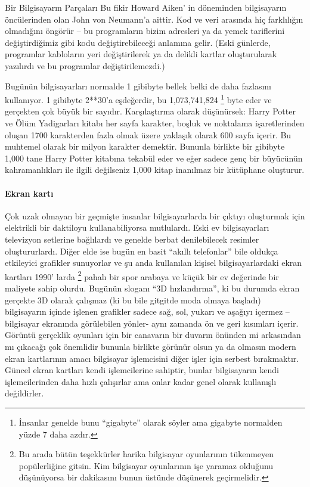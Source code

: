 \begin{section}{Bir Bilgisayarın Parçaları}
Bu fikir Howard Aiken' in döneminden bilgisayarın öncülerinden olan John von Neumann'a aittir. Kod ve veri arasında hiç farklılığın olmadığını öngörür – bu programların bizim adresleri ya da yemek tariflerini değiştirdiğimiz gibi kodu değiştirebileceği anlamına gelir. (Eski günlerde, programlar kabloların yeri değiştirilerek ya da delikli kartlar oluşturularak yazılırdı ve bu programlar değiştirilemezdi.)

Bugünün bilgisayarları normalde 1 gibibyte bellek belki de daha fazlasını kullanıyor. 1 gibibyte 2**30'a eşdeğerdir, bu 1,073,741,824 
\footnote{İnsanlar genelde bunu “gigabyte” olarak söyler ama gigabyte normalden yüzde 7 daha azdır.}
byte eder ve gerçekten çok büyük bir sayıdır. Karşılaştırma olarak düşünürsek: Harry Potter ve Ölüm Yadigarları kitabı her sayfa karakter, boşluk ve noktalama işaretlerinden oluşan 1700 karakterden fazla olmak üzere yaklaşık olarak 600 sayfa içerir. Bu muhtemel olarak bir milyon karakter demektir. Bununla birlikte bir gibibyte 1,000 tane Harry Potter kitabına tekabül eder ve eğer sadece genç bir büyücünün kahramanlıkları ile ilgili değilseniz 1,000 kitap inanılmaz bir kütüphane oluşturur.
\paragraph{Ekran kartı}{Çok uzak olmayan bir geçmişte insanlar bilgisayarlarda bir çıktıyı oluşturmak için elektrikli bir daktiloyu kullanabiliyorsa mutlulardı. Eski ev bilgisayarları televizyon setlerine bağlılardı ve genelde berbat denilebilecek resimler oluştururlardı. Diğer elde ise bugün en basit “akıllı telefonlar” bile oldukça etkileyici grafikler sunuyorlar ve şu anda kullanılan kişisel bilgisayarlardaki ekran kartları 1990' larda 
\footnote{Bu arada bütün teşekkürler harika bilgisayar oyunlarının tükenmeyen popülerliğine gitsin. Kim bilgisayar oyunlarının işe yaramaz olduğunu düşünüyorsa bir dakikasını bunun üstünde düşünerek geçirmelidir.}
pahalı bir spor arabaya ve küçük bir ev değerinde bir maliyete sahip olurdu. Bugünün sloganı “3D hızlandırma”, ki bu durumda ekran gerçekte 3D olarak çalışmaz (ki bu bile gitgitde moda olmaya başladı) bilgisayarın içinde işlenen grafikler sadece sağ, sol, yukarı ve aşağıyı içermez – bilgisayar ekranında görülebilen yönler- aynı zamanda ön ve geri kısımları içerir. Görüntü gerçeklik oyunları için bir canavarın bir duvarın önünden mi arkasından mı çıkacağı çok önemlidir bununla birlikte görünür olsun ya da olmasın modern ekran kartlarının amacı bilgisayar işlemcisini diğer işler için serbest bırakmaktır. Güncel ekran kartları kendi işlemcilerine sahiptir, bunlar bilgisayarın kendi işlemcilerinden daha hızlı çalışırlar ama onlar kadar genel olarak kullanışlı değildirler.}


\end{section}
